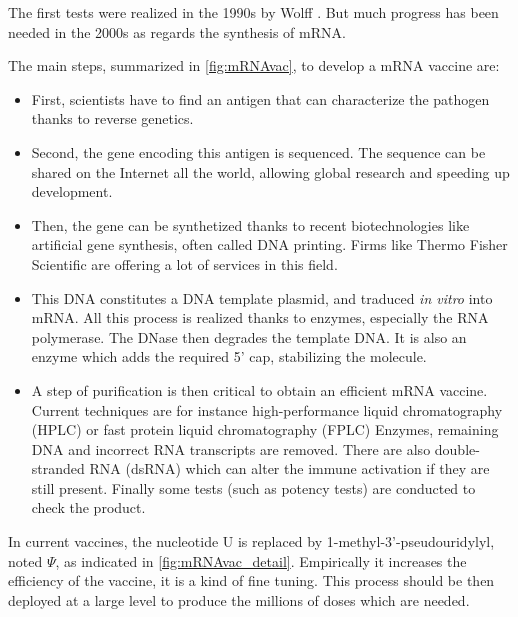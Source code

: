 \documentclass{article}
\begin{document}
            The first tests were realized in the 1990s by Wolff \autocite{wolffDirectGeneTransfer1990}.
            But much progress has been needed in the 2000s as regards the synthesis of mRNA.

            The main steps, summarized in \ref{fig:mRNAvac}, to develop a mRNA vaccine are:
            \begin{itemize}
                \item First, scientists have to find an antigen that can characterize the pathogen thanks to reverse genetics.
                \item Second, the gene encoding this antigen is sequenced. 
                    The sequence can be shared on the Internet all the world, allowing global research and speeding up development.
                \item Then, the gene can be synthetized thanks to recent biotechnologies like artificial gene synthesis, often called DNA printing. 
                    Firms like Thermo Fisher Scientific are offering a lot of services in this field.
                \item This DNA constitutes a DNA template plasmid, and traduced \emph{in vitro} into mRNA.
                        All this process is realized thanks to enzymes, especially the RNA polymerase. The DNase then degrades the template DNA.
                        It is also an enzyme which adds the required 5' cap, stabilizing the molecule.
                \item A step of purification is then critical to obtain an efficient mRNA vaccine. 
                        Current techniques are for instance high-performance liquid chromatography (HPLC) or fast protein liquid chromatography (FPLC)
                        Enzymes, remaining DNA and incorrect RNA transcripts are removed.
                        There are also double-stranded RNA (dsRNA) which can alter the immune activation if they are still present.
                        Finally some tests (such as potency tests) are conducted to check the product.
            \end{itemize} %

            In current vaccines, the nucleotide U is replaced by 1-methyl-3'-pseudouridylyl, noted $\Psi$, as indicated in \ref{fig:mRNAvac_detail}.
            Empirically it increases the efficiency of the vaccine, it is a kind of fine tuning.
            This process should be then deployed at a large level to produce the millions of doses which are needed.
\end{document}
